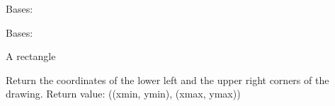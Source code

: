 \documentclass[letterpaper,10pt,english]{sphinxmanual}
\begin{document}

\begin{fulllineitems}
\label{api/gtrace.draw:gtrace.draw.dxf.NumberOfElementError}
Bases: 

\end{fulllineitems}


\begin{fulllineitems}
\label{api/gtrace.draw:gtrace.draw.dxf.Rectangle}
Bases: {\hyperref[api/gtrace.draw:gtrace.draw.dxf.Entity]{}}

A rectangle

\begin{fulllineitems}
\label{api/gtrace.draw:gtrace.draw.dxf.Rectangle.draw}
\end{fulllineitems}


\begin{fulllineitems}
\label{api/gtrace.draw:gtrace.draw.dxf.Rectangle.report_min_max}
Return the coordinates of the lower left and the upper right corners
of the drawing.
Return value: ((xmin, ymin), (xmax, ymax))

\end{fulllineitems}


\end{fulllineitems}

\end{document}
